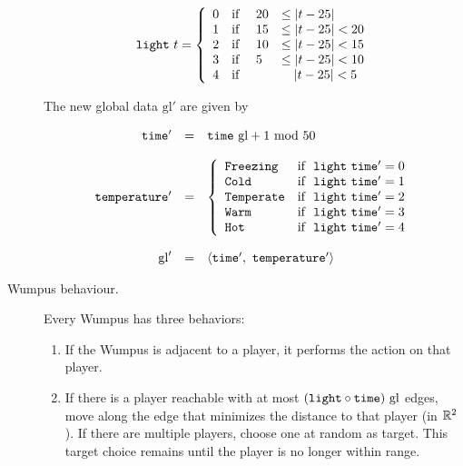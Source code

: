 \begin{definition}
\begin{description}
	$$
			\mathtt{light}\ t = 
			\left\{
				\begin{array}{l l l l}
					0 & \textnormal{if } & 20 & \leq |t - 25|\\
					1 & \textnormal{if } & 15 & \leq |t - 25| < 20\\
					2 & \textnormal{if } & 10 & \leq |t - 25| < 15\\
					3 & \textnormal{if } & 5 & \leq |t - 25| < 10\\
					4 & \textnormal{if } & & \ \ \ |t - 25| < 5
				\end{array}
			\right.
	$$
	
	The new global data $\mathrm{gl}'$ are given by
	
	$$
		\begin{array}{r c l}
		   \field{time'} & = &  \field{time}\ \mathrm{gl} + 1\ \mathrm{mod}\ 50\\
		   \\
			\field{temperature'} & = &
			\left\{
				\begin{array}{l l}
					\type{Freezing} & \mt{if }\ \field{light}\ \field{time'} = 0\\
					\type{Cold} & \mt{if }\ \field{light}\ \field{time'} = 1\\
					\type{Temperate} & \mt{if }\ \field{light}\ \field{time'} = 2\\
					\type{Warm} & \mt{if }\ \field{light}\ \field{time'} = 3\\
					\type{Hot} & \mt{if }\ \field{light}\ \field{time'} = 4
				\end{array}
			\right.\\
			\\
			\mathrm{gl}' & = & \langle \field{time'},\ \field{temperature'} \rangle\\
		\end{array}
	$$
	
	\item[Wumpus behaviour.] Every Wumpus has three behaviors:
	
	\begin{enumerate}
		\item If the Wumpus is adjacent to a player, it performs the  action on that player.
		
		\item If there is a player reachable with at most $(\field{light} \circ \field{time})\ \mathrm{gl}$ edges, move along the edge that minimizes the distance to that player (in $\mathbb{R}^2$). If there are multiple players, choose one at random as target. This target choice remains until the player is no longer within range.
		

\end{enumerate}
\end{description}
\end{definition}
